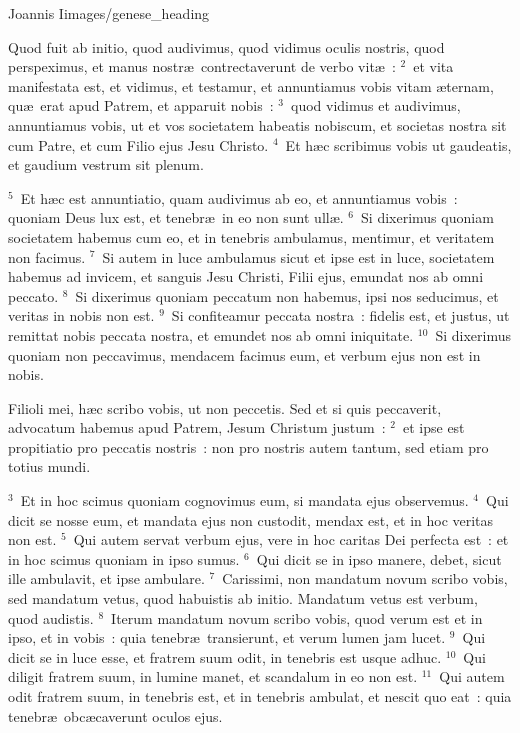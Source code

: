 {Joannis I}{images/genese_heading}


\lettrine[lines=10,image=true,loversize=0.05,lraise=-0.03]{Q}{}uod fuit ab initio, quod audivimus, quod vidimus oculis nostris, quod perspeximus, et manus nostr\ae\ contrectaverunt de verbo vit\ae~:
${}^{2}$~et vita manifestata est, et vidimus, et testamur, et annuntiamus vobis vitam \ae ternam, qu\ae\ erat apud Patrem, et apparuit nobis~:
${}^{3}$~quod vidimus et audivimus, annuntiamus vobis, ut et vos societatem habeatis nobiscum, et societas nostra sit cum Patre, et cum Filio ejus Jesu Christo.
${}^{4}$~Et h\ae c scribimus vobis ut gaudeatis, et gaudium vestrum sit plenum.


${}^{5}$~Et h\ae c est annuntiatio, quam audivimus ab eo, et annuntiamus vobis~: quoniam Deus lux est, et tenebr\ae\ in eo non sunt ull\ae .
${}^{6}$~Si dixerimus quoniam societatem habemus cum eo, et in tenebris ambulamus, mentimur, et veritatem non facimus.
${}^{7}$~Si autem in luce ambulamus sicut et ipse est in luce, societatem habemus ad invicem, et sanguis Jesu Christi, Filii ejus, emundat nos ab omni peccato.
${}^{8}$~Si dixerimus quoniam peccatum non habemus, ipsi nos seducimus, et veritas in nobis non est.
${}^{9}$~Si confiteamur peccata nostra~: fidelis est, et justus, ut remittat nobis peccata nostra, et emundet nos ab omni iniquitate.
${}^{10}$~Si dixerimus quoniam non peccavimus, mendacem facimus eum, et verbum ejus non est in nobis.

\lettrine[lines=10,image=true,loversize=0.05,lraise=-0.03]{F}{}ilioli mei, h\ae c scribo vobis, ut non peccetis. Sed et si quis peccaverit, advocatum habemus apud Patrem, Jesum Christum justum~:
${}^{2}$~et ipse est propitiatio pro peccatis nostris~: non pro nostris autem tantum, sed etiam pro totius mundi.


${}^{3}$~Et in hoc scimus quoniam cognovimus eum, si mandata ejus observemus.
${}^{4}$~Qui dicit se nosse eum, et mandata ejus non custodit, mendax est, et in hoc veritas non est.
${}^{5}$~Qui autem servat verbum ejus, vere in hoc caritas Dei perfecta est~: et in hoc scimus quoniam in ipso sumus.
${}^{6}$~Qui dicit se in ipso manere, debet, sicut ille ambulavit, et ipse ambulare.
${}^{7}$~Carissimi, non mandatum novum scribo vobis, sed mandatum vetus, quod habuistis ab initio. Mandatum vetus est verbum, quod audistis.
${}^{8}$~Iterum mandatum novum scribo vobis, quod verum est et in ipso, et in vobis~: quia tenebr\ae\ transierunt, et verum lumen jam lucet.
${}^{9}$~Qui dicit se in luce esse, et fratrem suum odit, in tenebris est usque adhuc.
${}^{10}$~Qui diligit fratrem suum, in lumine manet, et scandalum in eo non est.
${}^{11}$~Qui autem odit fratrem suum, in tenebris est, et in tenebris ambulat, et nescit quo eat~: quia tenebr\ae\ obc\ae caverunt oculos ejus.


